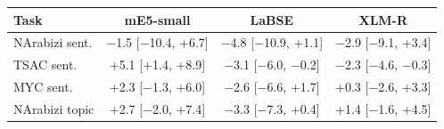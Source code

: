 \begin{tabular}{l ccc}
\toprule
Task & mE5-small & LaBSE & XLM-R \\
\midrule
NArabizi sent. & $-$1.5 [$-$10.4, +6.7] & $-$4.8 [$-$10.9, +1.1] & $-$2.9 [$-$9.1, +3.4] \\
TSAC sent. & +5.1 [+1.4, +8.9] & $-$3.1 [$-$6.0, $-$0.2] & $-$2.3 [$-$4.6, $-$0.3] \\
MYC sent. & +2.3 [$-$1.3, +6.0] & $-$2.6 [$-$6.6, +1.7] & +0.3 [$-$2.6, +3.3] \\
NArabizi topic & +2.7 [$-$2.0, +7.4] & $-$3.3 [$-$7.3, +0.4] & +1.4 [$-$1.6, +4.5] \\
\bottomrule
\end{tabular}
